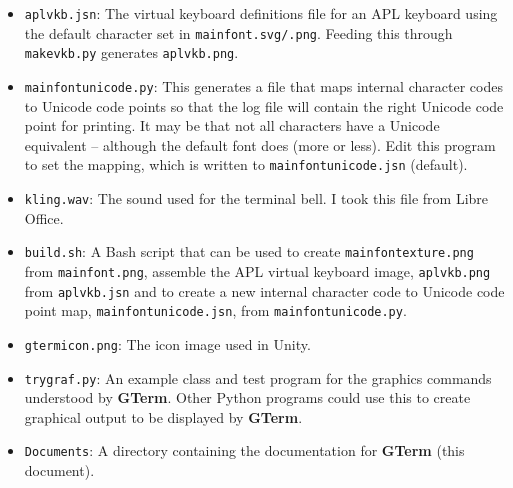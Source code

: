 \documentclass[a4paper,twoside,11pt]{article}
\begin{document}
\begin{itemize}
\item \texttt{aplvkb.jsn}: The virtual keyboard definitions file for an APL keyboard using the default character set in
      \texttt{mainfont.svg/.png}. Feeding this through \texttt{makevkb.py} generates \texttt{aplvkb.png}.
\item \texttt{mainfontunicode.py}: This generates a file that maps internal character codes to Unicode code points so that
      the log file will contain the right Unicode code point for printing. It may be that not all characters have 
      a Unicode equivalent -- although the default font does (more or less). Edit this program to set the mapping,
      which is written to \texttt{mainfontunicode.jsn} (default).
\item \texttt{kling.wav}: The sound used for the terminal bell. I took this file from Libre Office.
\item \texttt{build.sh}: A Bash script that can be used to create \texttt{mainfontexture.png}
      from \texttt{mainfont.png}, assemble the APL virtual
      keyboard image, \texttt{aplvkb.png} from \texttt{aplvkb.jsn} and to create a new internal 
      character code to Unicode code point map,
      \texttt{mainfontunicode.jsn}, from \texttt{mainfontunicode.py}.
\item \texttt{gtermicon.png}: The icon image used in Unity.
\item \texttt{trygraf.py}: An example class and test program for the graphics commands understood by \textbf{GTerm}.
      Other Python programs could use this to create graphical output to be displayed by \textbf{GTerm}.
\item \texttt{Documents}: A directory containing the documentation for \textbf{GTerm} (this document).
\end{itemize}
\end{document}
